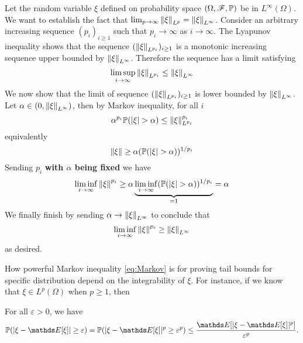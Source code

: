 \begin{example} Let the random variable $\xi$ defined on probability space $(\Omega,\mathcal{F},\mathbb{P})$ be in $L^\infty(\Omega)$. We want to establish the fact that $\lim_{p \to \infty} \left\| \xi \right\|_{L^p} = \left\| \xi \right\|_{L^\infty}$. Consider an arbitrary increasing sequence $(p_i)_{i \geq 1}$ such that $p_i \to \infty$ as $i \to \infty$. The Lyapunov inequality shows that the sequence $(\left\| \xi \right\|_{L^{p_i}})_{i\geq 1}$ is a monotonic increasing sequence upper bounded by $\left\| \xi \right\|_{L^\infty}$. Therefore the sequence has a limit satisfying
\begin{equation}
    \limsup_{i \to \infty} \left\| \xi \right\|_{L^{p_i}} \leq \left\| \xi \right\|_{L^\infty}
\end{equation}
We now show that the limit of sequence $(\left\| \xi \right\|_{L^{p_i}})_{i\geq 1}$ is lower bounded by $\left\| \xi \right\|_{L^\infty}$. Let $\alpha \in (0,\left\| \xi \right\|_{L^\infty})$, then by Markov inequality, for all $i$
\begin{equation}
    \alpha^{p_i} \mathbb{P}(|\xi| > \alpha) \leq \left\| \xi \right\|^{p_i}_{L^{p_i}} 
\end{equation}
equivalently
\begin{equation}
    \left\| \xi \right\| \geq \alpha (\mathbb{P}(|\xi| > \alpha))^{1/p_i}
\end{equation}
Sending $p_i$ \textbf{with $\alpha$ being fixed} we have
\begin{equation}
    \liminf_{i \to \infty} \left\| \xi \right\|^{p_i} \geq \alpha \underbrace{\liminf_{i \to \infty} (\mathbb{P}(|\xi| > \alpha))^{1/p_i}}_{=1} = \alpha
\end{equation}
We finally finish by sending $\alpha \to \left\| \xi \right\|_{L^\infty}$ to conclude that
\begin{equation}
    \liminf_{i \to \infty} \left\| \xi \right\|^{p_i} \geq \left\| \xi \right\|_{L^\infty}
\end{equation}
as desired.
\end{example}

How powerful Markov inequality \eqref{eq:Markov} is for proving tail bounds for specific distribution depend on the integrability of $\xi$. For instance, if we know that $\xi \in L^p(\Omega)$ when $p \geq 1$, then 

\begin{corollary} For all $\varepsilon > 0$, we have
\begin{equation} \label{eq:Lp_Chebyshev}
    \p(|\xi - \E[\xi]| \ge \varepsilon) = \p(|\xi - \E[\xi]|^p \ge \varepsilon^p) \le \frac{\E[|\xi - \E[\xi]|^p]}{\varepsilon^p}.
\end{equation}
\end{corollary}

